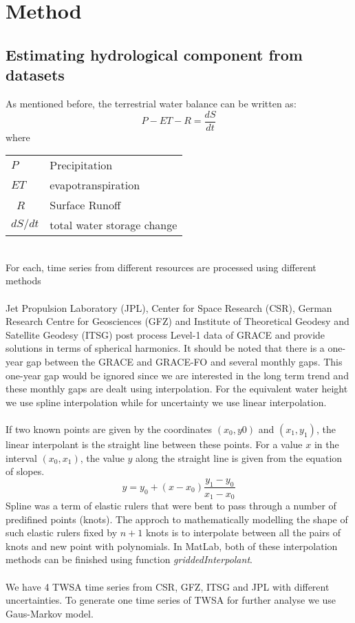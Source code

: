 \chapter{Method}
\section{Estimating hydrological component from datasets}\label{section:combine}
As mentioned before, the terrestrial water balance can be written as:
\begin{equation}
P - ET - R = \frac{dS}{dt}
\end{equation}
where
\begin{table}[htbp]
	\begin{tabular}{ll}
		$P$   & Precipitation    \\ 
		$ET$    & evapotranspiration \\ \
		$R$     & Surface Runoff \\ 
		$dS / dt$ & total water storage change \\ 
	\end{tabular}
\end{table}\\
For each, time series from different resources are processed using different methods\\\\
 Jet Propulsion Laboratory (JPL), Center for Space Research (CSR), German Research Centre for Geosciences (GFZ) and Institute of Theoretical Geodesy and Satellite Geodesy (ITSG)  post process Level-1 data of GRACE and provide solutions in terms of spherical harmonics. It should be noted that there is a one-year gap between the GRACE and GRACE-FO and several monthly gaps. This one-year gap would be ignored since we are interested in the long term trend and these monthly gaps are dealt using interpolation. For the equivalent water height we use spline interpolation while for uncertainty we use linear interpolation.\\\\
If two known points are given by the coordinates $(x_0,y0)$ and $(x_1,y_1)$, the linear interpolant is the straight line between these points. For a value $x$ in the interval $(x_0,x_1)$, the value $y$ along the straight line is given from the equation of slopes.
\begin{equation}
	y = y_0 + (x-x_0)\frac{y_1-y_0}{x_1-x_0}
\end{equation}
Spline was a term of elastic rulers that were bent to pass through a number of predifined points (knots). The approch to mathematically modelling the shape of such elastic rulers fixed by $n+1$ knots is to interpolate between all the pairs of knots and new point with polynomials. In MatLab, both of these interpolation methods can be finished using function \textit{griddedInterpolant}.\\\\
We have 4 TWSA time series from CSR, GFZ, ITSG and JPL with different uncertainties. To generate one time series of TWSA for further analyse we use Gaus-Markov model.

